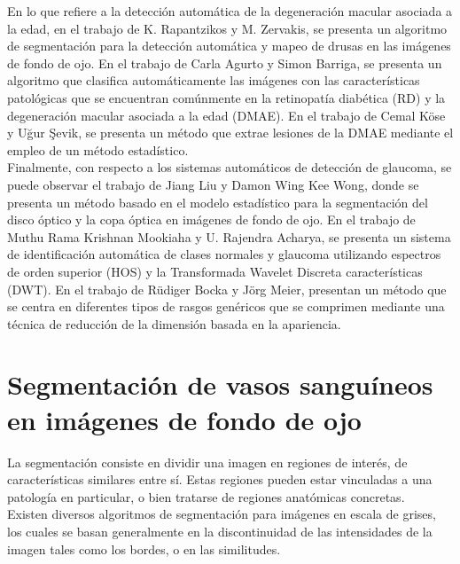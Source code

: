 En lo que refiere a la detecci\'on autom\'atica de la degeneraci\'on macular asociada a la edad, en el trabajo de K. Rapantzikos y  M. Zervakis, \cite{rapantzikos2003detection} se presenta un algoritmo de segmentaci\'on para la detecci\'on autom\'atica y mapeo de drusas en las im\'agenes de fondo de ojo. En el trabajo de Carla Agurto y Simon Barriga,  \cite{agurto2011automatic} se presenta un algoritmo que clasifica autom\'aticamente las im\'agenes con las caracter\'isticas patol\'ogicas que se encuentran com\'unmente en la retinopat\'ia diab\'etica (RD) y la degeneraci\'on macular asociada a la edad (DMAE). En el trabajo de Cemal Köse y Uğur Şevik, \cite{kose2010statistical} \cite{kose2008automatic} se presenta un m\'etodo que extrae lesiones de la DMAE mediante el empleo de un m\'etodo estad\'istico.\\

Finalmente, con respecto a los sistemas autom\'aticos de detecci\'on de glaucoma, se puede observar el trabajo de Jiang Liu y Damon Wing Kee Wong, \cite{yin2012automated} donde se presenta un m\'etodo basado en el modelo estad\'istico para la segmentaci\'on del disco \'optico y la copa \'optica en im\'agenes de fondo de ojo. En el trabajo de Muthu Rama Krishnan Mookiaha y U. Rajendra Acharya, \cite{mookiah2012data} se presenta un sistema de identificaci\'on autom\'atica de clases normales y glaucoma utilizando espectros de orden superior (HOS) y la Transformada Wavelet Discreta caracter\'isticas (DWT). En el trabajo de Rüdiger Bocka y Jörg Meier, \cite{bock2010glaucoma} presentan un m\'etodo que se centra en diferentes tipos de rasgos gen\'ericos que se comprimen mediante una t\'ecnica de reducci\'on de la dimensi\'on basada en la apariencia. 

\section{Segmentaci\'on de vasos sangu\'ineos en im\'agenes de fondo de ojo}
La segmentaci\'on consiste en dividir una imagen en regiones de inter\'es, de caracter\'isticas similares entre s\'i. Estas regiones pueden estar vinculadas a una patolog\'ia en particular, o bien tratarse de regiones anat\'omicas concretas. \\
Existen diversos algoritmos de segmentaci\'on para im\'agenes en escala de grises, los cuales se basan generalmente en la discontinuidad de las intensidades de la imagen tales como los bordes, o en las similitudes.\cite{coto2003metodos} \cite{chaudhuri1989detection}

